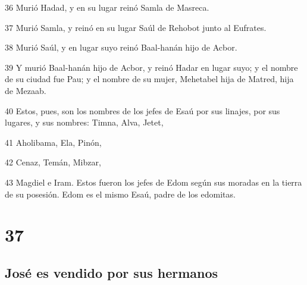 \par 36 Murió Hadad, y en su lugar reinó Samla de Masreca.
\par 37 Murió Samla, y reinó en su lugar Saúl de Rehobot junto al Eufrates.
\par 38 Murió Saúl, y en lugar suyo reinó Baal-hanán hijo de Acbor.
\par 39 Y murió Baal-hanán hijo de Acbor, y reinó Hadar en lugar suyo; y el nombre de su ciudad fue Pau; y el nombre de su mujer, Mehetabel hija de Matred, hija de Mezaab.
\par 40 Estos, pues, son los nombres de los jefes de Esaú por sus linajes, por sus lugares, y sus nombres: Timna, Alva, Jetet,
\par 41 Aholibama, Ela, Pinón,
\par 42 Cenaz, Temán, Mibzar,
\par 43 Magdiel e Iram. Estos fueron los jefes de Edom según sus moradas en la tierra de su posesión. Edom es el mismo Esaú, padre de los edomitas.

\chapter{37}

\section*{José es vendido por sus hermanos}


